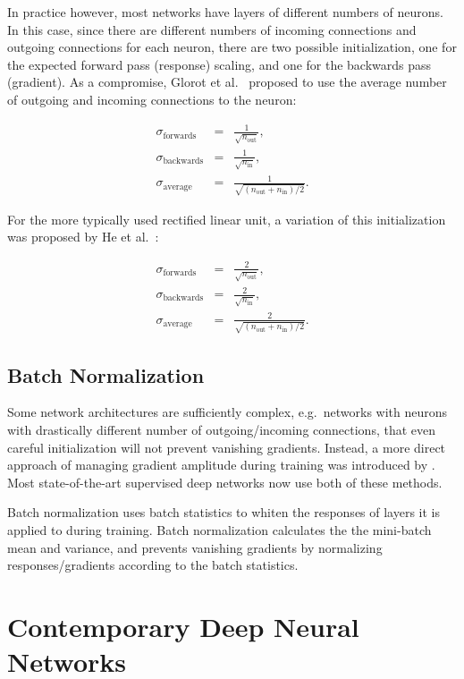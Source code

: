 \documentclass[thesis]{subfiles}
\begin{document}
In practice however, most networks have layers of different numbers of neurons. In this case, since there are different numbers of incoming connections and outgoing connections for each neuron, there are two possible initialization, one for the expected forward pass (response) scaling, and one for the backwards pass (gradient). As a compromise, Glorot et al.~\cite{glorot2010understanding} proposed to use the average number of outgoing and incoming connections to the neuron:

\begin{eqnarray*}
	\sigma_{\textrm{forwards}} &=& \frac{1}{\sqrt{n_{\text{out}}}},\\
	\sigma_{\textrm{backwards}} &=& \frac{1}{\sqrt{n_{\text{in}}}},\\
	\sigma_{\textrm{average}} &=& \frac{1}{\sqrt{(n_{\text{out}} + n_{\text{in}})/2}}.
\end{eqnarray*}

For the more typically used rectified linear unit, a variation of this initialization was proposed by He et al.~\cite{He2015delving}:

\begin{eqnarray*}
	\sigma_{\textrm{forwards}} &=& \frac{2}{\sqrt{n_{\text{out}}}},\\
	\sigma_{\textrm{backwards}} &=& \frac{2}{\sqrt{n_{\text{in}}}},\\
	\sigma_{\textrm{average}} &=& \frac{2}{\sqrt{(n_{\text{out}} + n_{\text{in}})/2}}.
\end{eqnarray*}

\subsection{Batch Normalization}
Some network architectures are sufficiently complex, e.g.~networks with neurons with drastically different number of outgoing/incoming connections, that even careful initialization will not prevent vanishing gradients. Instead, a more direct approach of managing gradient amplitude during training was introduced by \citet{Ioffe2015}. Most state-of-the-art supervised deep networks now use both of these methods.

Batch normalization uses batch statistics to whiten the responses of layers it is applied to during training. Batch normalization calculates the the mini-batch mean and variance, and prevents vanishing gradients by normalizing responses/gradients according to the batch statistics. 

\section{Contemporary Deep Neural Networks}
\end{document}
